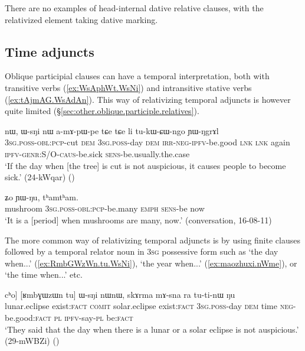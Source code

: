 There are no examples of head-internal dative relative clauses, with the relativized element taking dative marking.
 
\subsection{Time adjuncts} \label{sec:time.relativization}
Oblique participial clauses can have a temporal interpretation, both with transitive verbs (\ref{ex:WsAphWt.WsNi}) and intransitive stative verbs (\ref{ex:tAjmAG.WsAdAn}). This way of relativizing temporal adjuncts is however quite limited (§\ref{sec:other.oblique.participle.relatives}).

\begin{exe}
\ex \label{ex:WsAphWt.WsNi}
\gll [ɯ-sɤ-pʰɯt] nɯ, ɯ-sŋi nɯ a-mɤ-pɯ-pe tɕe tɕe li tu-kɯ-ɕɯ-ngo ɲɯ-ŋgrɤl \\
\textsc{3sg}.\textsc{poss}-\textsc{obl}:\textsc{pcp}-cut \textsc{dem} \textsc{3sg}.\textsc{poss}-day \textsc{dem} \textsc{irr}-\textsc{neg}-\textsc{ipfv}-be.good \textsc{lnk} \textsc{lnk} again \textsc{ipfv}-\textsc{genr}:S/O-\textsc{caus}-be.sick \textsc{sens}-be.usually.the.case \\
\glt `If the day when [the tree] is cut is not auspicious, it causes people to become sick.' (24-kWqar)
()
\end{exe}

\begin{exe}
\ex \label{ex:tAjmAG.WsAdAn}
 ʑo ɲɯ-ŋu, tʰamtʰam. \\
mushroom \textsc{3sg}.\textsc{poss}-\textsc{obl}:\textsc{pcp}-be.many \textsc{emph} \textsc{sens}-be now \\
\glt `It is a [period] when mushrooms are many, now.' (conversation, 16-08-11)
\end{exe}

The more common way of relativizing temporal adjuncts is by using finite clauses followed by a temporal relator noun in \textsc{3sg} possessive form such as   `the day when...' (\ref{ex:RmbGWzWn.tu.WsNi}),  `the year when...' (\ref{ex:maozhuxi.nWme}), or  `the time when...' etc.  
 
\begin{exe}
\ex \label{ex:RmbGWzWn.tu.WsNi}
\gll [[slɤzɯn tu] cʰo] [ʁmbɣɯzɯn tu] ɯ-sŋi nɯnɯ, skɤrma mɤ-sna ra tu-ti-nɯ ŋu \\
lunar.eclipse exist:\textsc{fact} \textsc{comit} solar.eclipse exist:\textsc{fact} \textsc{3sg}.\textsc{poss}-day \textsc{dem} time \textsc{neg}-be.good:\textsc{fact} \textsc{pl} \textsc{ipfv}-say-\textsc{pl} be:\textsc{fact} \\
\glt `They said that the day when there is a lunar or a solar eclipse is not auspicious.' (29-mWBZi)
()
\end{exe}

